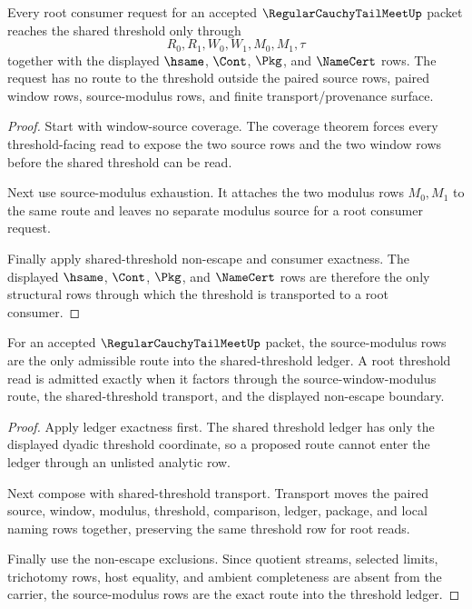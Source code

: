 \begin{theorem}
\label{thm:regular-cauchy-tail-meet-root-window-threshold-coverage}
Every root consumer request for an accepted $\RegularCauchyTailMeetUp$ packet reaches the shared threshold only through
$$
R_0,R_1,W_0,W_1,M_0,M_1,\tau
$$
together with the displayed $\hsame$, $\Cont$, $\Pkg$, and $\NameCert$ rows. The request has no route to the threshold outside the paired source rows, paired window rows, source-modulus rows, and finite transport/provenance surface.
\end{theorem}
\begin{proof}
Start with window-source coverage. The coverage theorem forces every threshold-facing read to expose the two source rows and the two window rows before the shared threshold can be read.

Next use source-modulus exhaustion. It attaches the two modulus rows $M_0,M_1$ to the same route and leaves no separate modulus source for a root consumer request.

Finally apply shared-threshold non-escape and consumer exactness. The displayed $\hsame$, $\Cont$, $\Pkg$, and $\NameCert$ rows are therefore the only structural rows through which the threshold is transported to a root consumer.
\end{proof}

\begin{theorem}
\label{thm:regular-cauchy-tail-meet-root-modulus-route-exactness}
For an accepted $\RegularCauchyTailMeetUp$ packet, the source-modulus rows are the only admissible route into the shared-threshold ledger. A root threshold read is admitted exactly when it factors through the source-window-modulus route, the shared-threshold transport, and the displayed non-escape boundary.
\end{theorem}
\begin{proof}
Apply ledger exactness first. The shared threshold ledger has only the displayed dyadic threshold coordinate, so a proposed route cannot enter the ledger through an unlisted analytic row.

Next compose with shared-threshold transport. Transport moves the paired source, window, modulus, threshold, comparison, ledger, package, and local naming rows together, preserving the same threshold row for root reads.

Finally use the non-escape exclusions. Since quotient streams, selected limits, trichotomy rows, host equality, and ambient completeness are absent from the carrier, the source-modulus rows are the exact route into the threshold ledger.
\end{proof}

